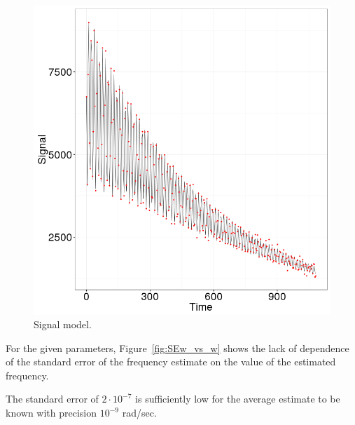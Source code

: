 \documentclass{article}
\begin{document}
\begin{figure}[h]
	\centering
	\includegraphics[scale=.8]{img/StatReq/Signal_model}
	\caption{Signal model.\label{fig:SignalModel}}
\end{figure}

For the given parameters, Figure~\ref{fig:SEw_vs_w} shows the lack of dependence of the standard error of the frequency estimate on the value of the estimated frequency.

The standard error of $2\cdot 10^{-7}$ is sufficiently low for the average estimate to be known with precision $10^{-9}$ rad/sec.
\end{document}
